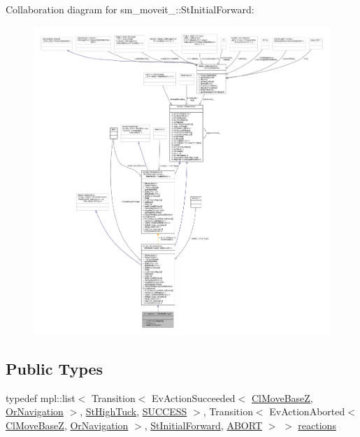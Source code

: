 Collaboration diagram for sm\+\_\+moveit\+\_\+:\+:St\+Initial\+Forward\+:
\nopagebreak
\begin{figure}[H]
\begin{center}
\leavevmode
\includegraphics[width=350pt]{structsm__moveit__3_1_1StInitialForward__coll__graph}
\end{center}
\end{figure}
\subsection*{Public Types}
\begin{DoxyCompactItemize}
\item 
typedef mpl\+::list$<$ Transition$<$ Ev\+Action\+Succeeded$<$ \hyperlink{classcl__move__base__z_1_1ClMoveBaseZ}{Cl\+Move\+BaseZ}, \hyperlink{classsm__moveit__3_1_1OrNavigation}{Or\+Navigation} $>$, \hyperlink{structsm__moveit__3_1_1StHighTuck}{St\+High\+Tuck}, \hyperlink{classSUCCESS}{S\+U\+C\+C\+E\+SS} $>$, Transition$<$ Ev\+Action\+Aborted$<$ \hyperlink{classcl__move__base__z_1_1ClMoveBaseZ}{Cl\+Move\+BaseZ}, \hyperlink{classsm__moveit__3_1_1OrNavigation}{Or\+Navigation} $>$, \hyperlink{structsm__moveit__3_1_1StInitialForward}{St\+Initial\+Forward}, \hyperlink{classABORT}{A\+B\+O\+RT} $>$ $>$ \hyperlink{structsm__moveit__3_1_1StInitialForward_a30c579fb07bd03ec88e8cf2eb5fba3ae}{reactions}
\end{DoxyCompactItemize}
